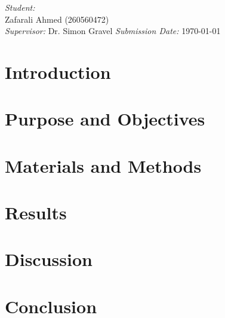 \documentclass[12pt]{article}
\begin{document}
\begin{titlepage}
    \begin{center}
        \emph{Student:}\\
        Zafarali Ahmed (260560472)\\[1.0cm]
        \emph{Supervisor:}
        Dr. Simon Gravel
        \emph{Submission Date:}
        \today
    \end{center}
\end{titlepage}

\begin{abstract}

\end{abstract}

\section{Introduction}
\section{Purpose and Objectives}
\section{Materials and Methods}
\section{Results}
\section{Discussion}
\section{Conclusion}

\pagebreak



\end{document}
